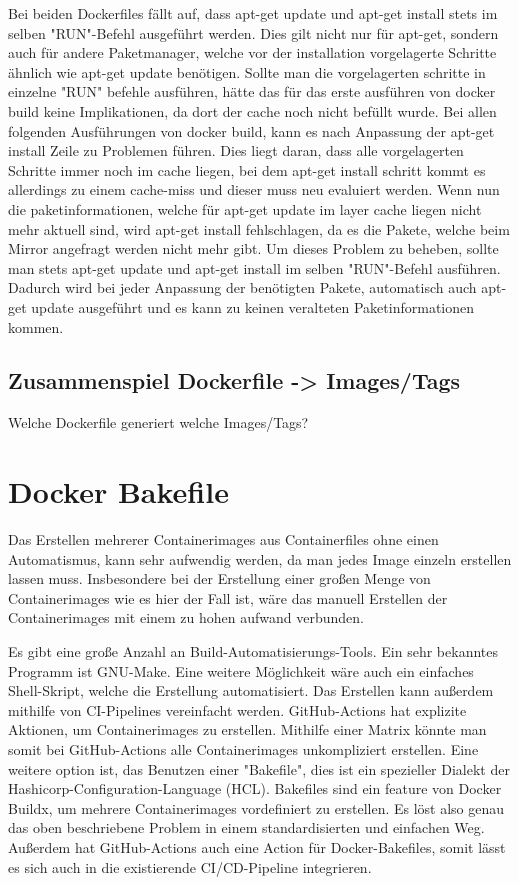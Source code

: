 Bei beiden Dockerfiles fällt auf, dass apt-get update und apt-get install stets im selben "RUN"-Befehl ausgeführt werden. Dies gilt nicht nur für apt-get, sondern auch für andere Paketmanager, welche vor der installation vorgelagerte Schritte ähnlich wie apt-get update benötigen. Sollte man die vorgelagerten schritte in einzelne "RUN" befehle ausführen, hätte das für das erste ausführen von docker build keine Implikationen, da dort der cache noch nicht befüllt wurde. Bei allen folgenden Ausführungen von docker build, kann es nach Anpassung der apt-get install Zeile zu Problemen führen. Dies liegt daran, dass alle vorgelagerten Schritte immer noch im cache liegen, bei dem apt-get install schritt kommt es allerdings zu einem cache-miss und dieser muss neu evaluiert werden. Wenn nun die paketinformationen, welche für apt-get update im layer cache liegen nicht mehr aktuell sind, wird apt-get install fehlschlagen, da es die Pakete, welche beim Mirror angefragt werden nicht mehr gibt. Um dieses Problem zu beheben, sollte man stets apt-get update und apt-get install im selben "RUN"-Befehl ausführen. Dadurch wird bei jeder Anpassung der benötigten Pakete, automatisch auch apt-get update ausgeführt und es kann zu keinen veralteten Paketinformationen kommen. 

\subsection{Zusammenspiel Dockerfile -> Images/Tags}

Welche Dockerfile generiert welche Images/Tags?

\section{Docker Bakefile}

Das Erstellen mehrerer Containerimages aus Containerfiles ohne einen Automatismus, kann sehr aufwendig werden, da man jedes Image einzeln erstellen lassen muss. Insbesondere bei der Erstellung einer großen Menge von Containerimages wie es hier der Fall ist, wäre das manuell Erstellen der Containerimages mit einem zu hohen aufwand verbunden. 

Es gibt eine große Anzahl an Build-Automatisierungs-Tools. Ein sehr bekanntes Programm ist GNU-Make. Eine weitere Möglichkeit wäre auch ein einfaches Shell-Skript, welche die Erstellung automatisiert. Das Erstellen kann außerdem mithilfe von CI-Pipelines vereinfacht werden. GitHub-Actions hat explizite Aktionen, um Containerimages zu erstellen. Mithilfe einer Matrix könnte man somit bei GitHub-Actions alle Containerimages unkompliziert erstellen. Eine weitere option ist, das Benutzen einer "Bakefile", dies ist ein spezieller Dialekt der Hashicorp-Configuration-Language (HCL). Bakefiles sind ein feature von Docker Buildx, um mehrere Containerimages vordefiniert zu erstellen. Es löst also genau das oben beschriebene Problem in einem standardisierten und einfachen Weg. Außerdem hat GitHub-Actions auch eine Action für Docker-Bakefiles, somit lässt es sich auch in die existierende CI/CD-Pipeline integrieren. 


